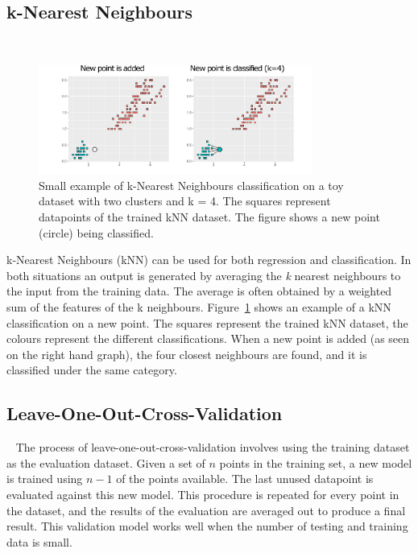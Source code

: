 \subsection{k-Nearest Neighbours}~\label{sec:kNN}
\begin{figure}[t]
    \centering
    \includegraphics[width=0.8\textwidth]{background/graphics/knn1.pdf}
    \caption{Small example of k-Nearest Neighbours classification on a toy dataset with two clusters and k = 4. The squares represent datapoints of the trained kNN dataset. The figure shows a new point (circle) being classified.}
    \label{fig:knn}
\end{figure}
k-Nearest Neighbours (kNN) can be used for both regression and classification.
In both situations an output is generated by averaging the \textit{k} nearest neighbours to the input from the training data.
The average is often obtained by a weighted sum of the features of the k neighbours.
Figure~\ref{fig:knn} shows an example of a kNN classification on a new point.
The squares represent the trained kNN dataset, the colours represent the different classifications.
When a new point is added (as seen on the right hand graph), the four closest neighbours are found, and it is classified under the same category.
\vspace{-0.5em}
\subsection{Leave-One-Out-Cross-Validation}~\label{sec:valid}
The process of leave-one-out-cross-validation involves using the training dataset as the evaluation dataset.
Given a set of $n$ points in the training set, a new model is trained using $n-1$ of the points available.
The last unused datapoint is evaluated against this new model.
This procedure is repeated for every point in the dataset, and the results of the evaluation are averaged out to produce a final result.
This validation model works well when the number of testing and training data is small.
\vspace{-1em}

